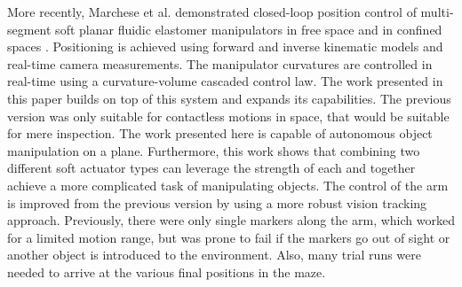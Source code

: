 More recently, Marchese et al. demonstrated closed-loop position control of multi-segment soft planar fluidic elastomer manipulators in free space \cite{marchese2014design} and in confined spaces \cite{marchese2014whole}. Positioning is achieved using forward and inverse kinematic models and real-time camera measurements. 
The manipulator curvatures are controlled in real-time using a curvature-volume cascaded control law.
The work presented in this paper builds on top of this system and expands its capabilities.
The previous version was only suitable for contactless motions in space, that would be suitable for mere inspection.
The work presented here is capable of autonomous object manipulation on a plane. 
Furthermore, this work shows that combining two different soft actuator types can leverage the strength of each and together achieve a more complicated task of manipulating objects.
The control of the arm is improved from the previous version by using a more robust vision tracking approach. 
Previously, there were only single markers along the arm, which worked for a limited motion range, but was prone to fail if the markers go out of sight or another object is introduced to the environment. 
Also, many trial runs were needed to arrive at the various final positions in the maze.

